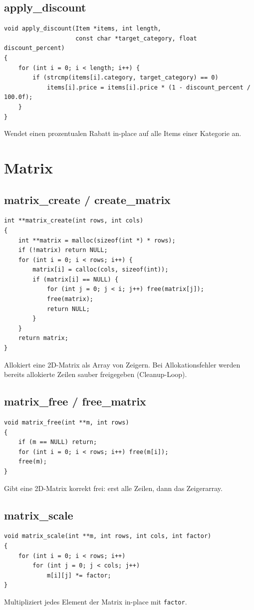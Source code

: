 \documentclass[10pt, a4paper]{article}
\begin{document}
\subsection{apply\_discount}
\begin{lstlisting}
void apply_discount(Item *items, int length,
                    const char *target_category, float discount_percent)
{
    for (int i = 0; i < length; i++) {
        if (strcmp(items[i].category, target_category) == 0)
            items[i].price = items[i].price * (1 - discount_percent / 100.0f);
    }
}
\end{lstlisting}
Wendet einen prozentualen Rabatt in-place auf alle Items einer Kategorie an.

\newpage
\section{Matrix}

\subsection{matrix\_create / create\_matrix}
\begin{lstlisting}
int **matrix_create(int rows, int cols)
{
    int **matrix = malloc(sizeof(int *) * rows);
    if (!matrix) return NULL;
    for (int i = 0; i < rows; i++) {
        matrix[i] = calloc(cols, sizeof(int));
        if (matrix[i] == NULL) {
            for (int j = 0; j < i; j++) free(matrix[j]);
            free(matrix);
            return NULL;
        }
    }
    return matrix;
}
\end{lstlisting}
Allokiert eine 2D-Matrix als Array von Zeigern. Bei Allokationsfehler werden bereits allokierte Zeilen sauber freigegeben (Cleanup-Loop).

\subsection{matrix\_free / free\_matrix}
\begin{lstlisting}
void matrix_free(int **m, int rows)
{
    if (m == NULL) return;
    for (int i = 0; i < rows; i++) free(m[i]);
    free(m);
}
\end{lstlisting}
Gibt eine 2D-Matrix korrekt frei: erst alle Zeilen, dann das Zeigerarray.

\subsection{matrix\_scale}
\begin{lstlisting}
void matrix_scale(int **m, int rows, int cols, int factor)
{
    for (int i = 0; i < rows; i++)
        for (int j = 0; j < cols; j++)
            m[i][j] *= factor;
}
\end{lstlisting}
Multipliziert jedes Element der Matrix in-place mit \texttt{factor}.
\end{document}
